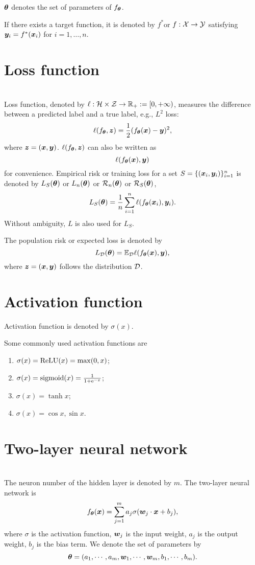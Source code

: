 \documentclass{article}
\begin{document}
$\bm{\theta}$  denotes the set of parameters of  $f_{\bm{\theta}}$.  

If there exists a target function, it is denoted by $f^*$or $f:\mathcal{X}\to\mathcal{Y}$ satisfying $\bm{y}_i=f^*(\bm{x}_i)$ for $i=1,\ldots,n$.

\section{Loss function}~\\
Loss function, denoted by $\ell:\mathcal{H}\times\mathcal{Z}\to\mathbb{R}_+:=[0,+\infty)$, measures the difference between a predicted label and a true label, e.g., $L^2$ loss: 
\[
\ell(f_{\bm{\theta}},\bm{z})=\frac{1}{2}(f_{\bm{\theta}}(\bm{x})-\bm{y})^2,
\]
 where $\bm{z}=(\bm{x},\bm{y})$. $\ell(f_{\bm{\theta}},\bm{z})$ can also be written as 
\[
\ell(f_{\bm{\theta}}(\bm{x}),\bm{y})
\]
 for convenience.
Empirical risk or training loss for a set $S=\{(\bm{x}_i,\bm{y}_i)\}_{i=1}^{n}$ is denoted by   $L_S(\bm{\theta})$ or $L_{n}(\bm{\theta})$ or $\mathcal{R}_{n}(\bm{\theta})$ or $\mathcal{R}_{S}(\bm{\theta})$,
\begin{equation}
    L_S(\bm{\theta}) =\frac{1}{n}\sum_{i=1}^n\ell(f_{\bm{\theta}}(\bm{x}_i),\bm{y}_i).
\end{equation}
Without ambiguity, $L$ is also used for $L_S$.

The population risk or expected loss is denoted by
\begin{equation}
    L_{\mathcal{D}}(\bm{\theta}) =\mathbb{E}_{\mathcal{D}}\ell(f_{\bm{\theta}}(\bm{x}),\bm{y}),
\end{equation}
where $\bm{z}=(\bm{x},\bm{y})$ follows the distribution $\mathcal{D}$.

\section{Activation function}
Activation function is denoted by $\sigma(x)$. 
\begin{exam}Some commonly used activation functions are~\\
    \begin{enumerate}
        \item $\sigma(x) = \mathrm{ReLU} (x) = \max (0, x)$;
        \item $\sigma(x) ={\rm sigmoid}(x)= \frac{1}{1 + \mathrm{e}^{-x}}$;
        \item $\sigma(x) = \tanh x$;
        \item $\sigma(x) = \cos x, \sin x$.
    \end{enumerate}
\end{exam}


\section{Two-layer neural network}~\\
The neuron number of the hidden layer is denoted by $m$. The two-layer neural network is 
\begin{equation}
    f_{\bm{\theta}}(\bm{x})=\sum_{j=1}^{m} a_j \sigma (\bm{w}_j\cdot \bm{x} + b_j),
\end{equation}
where $\sigma$ is the activation function, $\bm{w}_j$ is the input weight, $a_j$ is the output weight, $b_j$ is the bias term. We denote the set of parameters by 
\[
\bm{\theta}=(a_1,\cdots,a_m,\bm{w}_1,\cdots,\bm{w}_m,b_1,\cdots,b_m).
\] 
\end{document}
